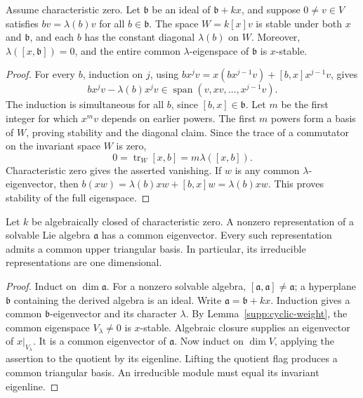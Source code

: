 \begin{lemma}\label{supp:cyclic-weight}
Assume characteristic zero. Let \(\mathfrak b\) be an ideal
of \(\mathfrak b+kx\), and suppose \(0\ne v\in V\) satisfies
\(bv=\lambda(b)v\) for all \(b\in\mathfrak b\).
The space \(W=k[x]v\) is stable under both \(x\) and
\(\mathfrak b\), and each \(b\) has the constant diagonal
\(\lambda(b)\) on \(W\). Moreover,
\(\lambda([x,\mathfrak b])=0\), and the entire common
\(\lambda\)-eigenspace of \(\mathfrak b\) is \(x\)-stable.
\end{lemma}

\begin{proof}
For every \(b\), induction on \(j\), using
\(bx^jv=x(bx^{j-1}v)+[b,x]x^{j-1}v\), gives
\[
 bx^jv-\lambda(b)x^jv
       \in\operatorname{span}(v,xv,\ldots,x^{j-1}v).
\]
The induction is simultaneous for all \(b\), since
\([b,x]\in\mathfrak b\).
Let \(m\) be the first integer for which \(x^mv\)
depends on earlier powers. The first \(m\) powers form
a basis of \(W\), proving stability and the diagonal claim.
Since the trace of a commutator on the invariant space \(W\)
is zero,
\[
 0=\operatorname{tr}_W[x,b]=m\lambda([x,b]).
\]
Characteristic zero gives the asserted vanishing.
If \(w\) is any common \(\lambda\)-eigenvector, then
\(b(xw)=\lambda(b)xw+[b,x]w=\lambda(b)xw\).
This proves stability of the full eigenspace.
\end{proof}

\begin{theorem}\label{res:B02}
Let \(k\) be algebraically closed of characteristic zero.
A nonzero representation of a solvable Lie algebra
\(\mathfrak a\) has a common eigenvector. Every such
representation admits a common upper triangular basis.
In particular, its irreducible representations are
one dimensional.
\end{theorem}

\begin{proof}
Induct on \(\dim\mathfrak a\). For a nonzero solvable
algebra, \([\mathfrak a,\mathfrak a]\ne\mathfrak a\);
a hyperplane \(\mathfrak b\) containing the derived algebra
is an ideal. Write \(\mathfrak a=\mathfrak b+kx\).
Induction gives a common \(\mathfrak b\)-eigenvector and
its character \(\lambda\).
By Lemma~\ref{supp:cyclic-weight}, the common eigenspace
\(V_\lambda\ne0\) is \(x\)-stable. Algebraic closure
supplies an eigenvector of \(x|_{V_\lambda}\).
It is a common eigenvector of \(\mathfrak a\).
Now induct on \(\dim V\), applying the assertion to the
quotient by its eigenline. Lifting the quotient flag
produces a common triangular basis. An irreducible
module must equal its invariant eigenline.
\end{proof}

